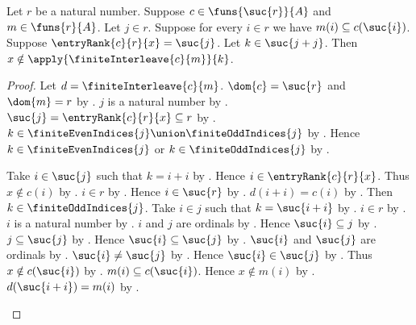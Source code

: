 \begin{lemma}\label{entry_rank_interleave_no_entry_before_inserted}
    Let $r$ be a natural number.
    Suppose $c\in\funs{\suc{r}}{A}$ and $m\in\funs{r}{A}$.
    Let $j\in r$.
    Suppose for every $i\in r$ we have
        $m(i)\subseteq c(\suc{i})$.
    Suppose $\entryRank{c}{r}{x}=\suc{j}$.
    Let $k\in\suc{j+j}$.
    Then $x\notin\apply{\finiteInterleave{c}{m}}{k}$.
\end{lemma}
\begin{proof}
    Let $d=\finiteInterleave{c}{m}$.
    $\dom{c}=\suc{r}$ and $\dom{m}=r$ by .
    $j$ is a natural number
        by .
    $\suc{j}=\entryRank{c}{r}{x}\subseteq r$
        by .
    $k\in\finiteEvenIndices{j}\union\finiteOddIndices{j}$
        by .
    Hence $k\in\finiteEvenIndices{j}$ or
        $k\in\finiteOddIndices{j}$ by .
    \begin{byCase}
        Take $i\in\suc{j}$ such that $k=i+i$
            by .
        Hence $i\in\entryRank{c}{r}{x}$.
        Thus $x\notin c(i)$
            by .
        $i\in r$ by .
        Hence $i\in\suc{r}$ by .
        $d(i+i)=c(i)$ by .
        Then $k\in\finiteOddIndices{j}$.
        Take $i\in j$ such that $k=\suc{i+i}$
            by .
        $i\in r$
            by .
        $i$ is a natural number
            by .
        $i$ and $j$ are ordinals
            by .
        Hence $\suc{i}\subseteq j$
            by .
        $j\subseteq\suc{j}$ by .
        Hence $\suc{i}\subseteq\suc{j}$
            by .
        $\suc{i}$ and $\suc{j}$ are ordinals
            by .
        $\suc{i}\neq\suc{j}$
            by .
        Hence $\suc{i}\in\suc{j}$
            by .
        Thus $x\notin c(\suc{i})$
            by .
        $m(i)\subseteq c(\suc{i})$.
        Hence $x\notin m(i)$ by .
        $d(\suc{i+i})=m(i)$
            by .
    \end{byCase}
\end{proof}

